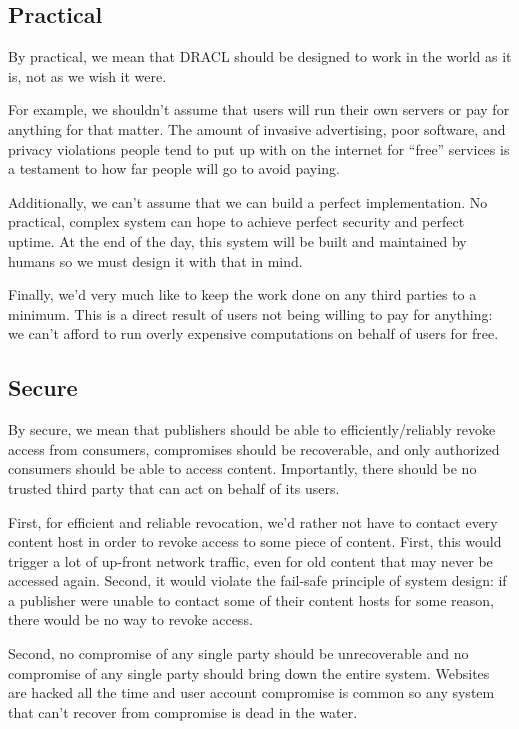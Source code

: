 \documentclass[pdftex,12pt,a4papaer]{report}
\begin{document}
\subsection{Practical}

By practical, we mean that DRACL should be designed to work in the world as it
is, not as we wish it were.

For example, we shouldn't assume that users will run their own servers or pay
for anything for that matter. The amount of invasive advertising, poor software,
and privacy violations people tend to put up with on the internet for ``free''
services is a testament to how far people will go to avoid paying.

Additionally, we can't assume that we can build a perfect implementation.
No practical, complex system can hope to achieve perfect security and perfect
uptime. At the end of the day, this system will be built and maintained by
humans so we must design it with that in mind.

Finally, we'd very much like to keep the work done on any third parties to a
minimum. This is a direct result of users not being willing to pay for anything:
we can't afford to run overly expensive computations on behalf of users for
free.

\subsection{Secure}

By secure, we mean that publishers should be able to efficiently/reliably
revoke access from consumers, compromises should be recoverable, and only
authorized consumers should be able to access content. Importantly, there should
be no trusted third party that can act on behalf of its users.

First, for efficient and reliable revocation, we'd rather not have to contact
every content host in order to revoke access to some piece of content. First,
this would trigger a lot of up-front network traffic, even for old content that
may never be accessed again. Second, it would violate the fail-safe principle of
system design: if a publisher were unable to contact some of their content
hosts for some reason, there would be no way to revoke access.

Second, no compromise of any single party should be unrecoverable and no
compromise of any single party should bring down the entire system. Websites are
hacked all the time and user account compromise is common so any system that
can't recover from compromise is dead in the water.
\end{document}
